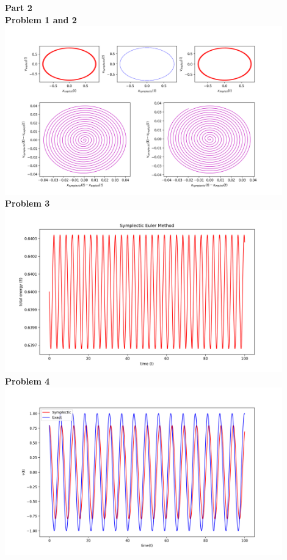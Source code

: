 \documentclass[12pt]{article}
\begin{document}
	\noindent\textbf{\large Part 2}\\
	
	\indent\textbf{Problem 1 and 2}\\
			\includegraphics[width=0.9\textwidth]{Figure_7.png}\\

	\indent\textbf{Problem 3}\\
		\includegraphics[width=0.9\textwidth]{Figure_8.png}\\
	
	\indent\textbf{Problem 4}\\
		\includegraphics[width=0.9\textwidth]{Figure_9.png}\\
		
\end{document}
